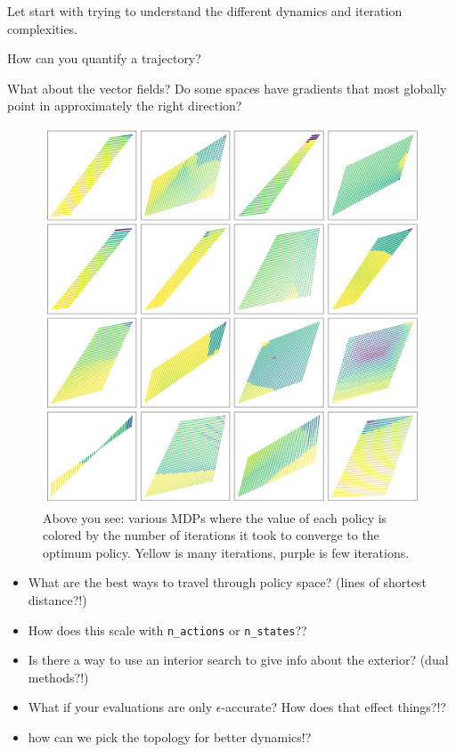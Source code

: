 Let start with trying to understand the different dynamics and iteration complexities.

How can you quantify a trajectory?

What about the vector fields?
Do some spaces have gradients that most globally point in approximately the right direction?



\begin{figure}
\centering
\includegraphics[width=1\textwidth,height=1\textheight]{../../pictures/figures/mvi-iterations.png}
\caption{Above you see: various MDPs where the value of each policy is colored
by the number of iterations it took to converge to the optimum policy. Yellow is many iterations, purple is few iterations.}
\end{figure}

\begin{itemize}
\tightlist
\item
  What are the best ways to travel through policy space? (lines of
  shortest distance?!)
\item
  How does this scale with \texttt{n\_actions} or \texttt{n\_states}??
\item
  Is there a way to use an interior search to give info about the
  exterior? (dual methods?!)
\item
  What if your evaluations are only \(\epsilon\)-accurate? How does that
  effect things?!?
\item
  how can we pick the topology for better dynamics!?
\end{itemize}



